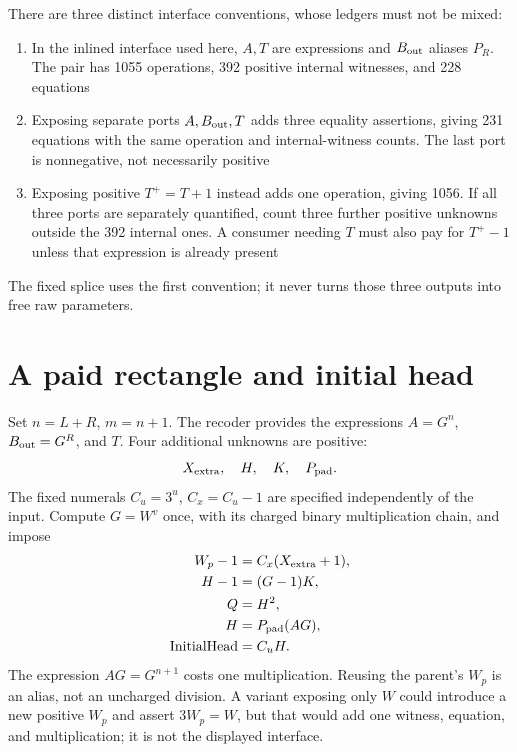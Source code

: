 \documentclass[11pt,letterpaper]{article}
\theoremstyle{definition}\newtheorem{definition}[theorem]{Definition}
\theoremstyle{remark}\newtheorem{remark}[theorem]{Remark}
\begin{document}
There are three distinct interface conventions, whose ledgers must not be mixed:
\begin{enumerate}
\item In the inlined interface used here, $A,T$ are expressions and $B_{\rm out}$ aliases $P_R$. The pair has 1055 operations, 392 positive internal witnesses, and 228 equations
\item Exposing separate ports $A,B_{\rm out},T$ adds three equality assertions, giving 231 equations with the same operation and internal-witness counts. The last port is nonnegative, not necessarily positive
\item Exposing positive $T^+=T+1$ instead adds one operation, giving 1056. If all three ports are separately quantified, count three further positive unknowns outside the 392 internal ones. A consumer needing $T$ must also pay for $T^+-1$ unless that expression is already present
\end{enumerate}
The fixed splice uses the first convention; it never turns those three outputs into free raw parameters.

\section{A paid rectangle and initial head}\label{ptr:ai:sec:geometry}
Set $n=L+R$, $m=n+1$. The recoder provides the expressions $A=G^n$, $B_{\rm out}=G^R$, and $T$. Four additional unknowns are positive:
\[
 X_{\rm extra},\quad H,\quad K,\quad P_{\rm pad}.
\]
The fixed numerals $C_u=3^u$, $C_x=C_u-1$ are specified independently of the input. Compute $G=W^v$ once, with its charged binary multiplication chain, and impose
\begin{align}
 W_p-1&=C_x(X_{\rm extra}+1),\label{ptr:ai:eq:width}\\
 H-1&=(G-1)K,\\
 Q&=H^2,\\
 H&=P_{\rm pad}(AG),\label{ptr:ai:eq:padding}\\
 \mathrm{InitialHead}&=C_uH.\label{ptr:ai:eq:head}
\end{align}
The expression $AG=G^{n+1}$ costs one multiplication. Reusing the parent's $W_p$ is an alias, not an uncharged division. A variant exposing only $W$ could introduce a new positive $W_p$ and assert $3W_p=W$, but that would add one witness, equation, and multiplication; it is not the displayed interface.
\end{document}
